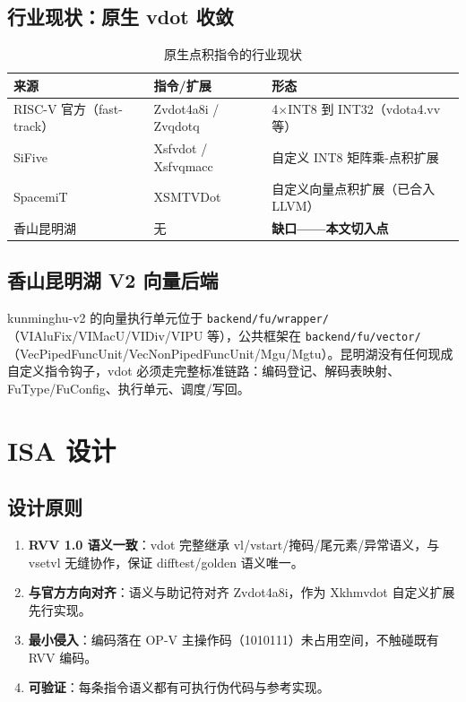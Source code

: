 \documentclass[11pt]{article}
\begin{document}
\subsection{行业现状：原生 vdot 收敛}
\begin{table}[htbp]
\centering
\caption{原生点积指令的行业现状}
\label{tab:industry}
\begin{tabular}{l l l}
\toprule
\textbf{来源} & \textbf{指令/扩展} & \textbf{形态} \\
\midrule
RISC-V 官方（fast-track） & Zvdot4a8i / Zvqdotq & 4$\times$INT8 到 INT32（vdota4.vv 等） \\
SiFive & Xsfvdot / Xsfvqmacc & 自定义 INT8 矩阵乘-点积扩展 \\
SpacemiT & XSMTVDot & 自定义向量点积扩展（已合入 LLVM） \\
香山昆明湖 & 无 & \textbf{缺口——本文切入点} \\
\bottomrule
\end{tabular}
\end{table}

\subsection{香山昆明湖 V2 向量后端}
kunminghu-v2 的向量执行单元位于 \texttt{backend/fu/wrapper/}（VIAluFix/VIMacU/VIDiv/VIPU 等），公共框架在 \texttt{backend/fu/vector/}（VecPipedFuncUnit/VecNonPipedFuncUnit/Mgu/Mgtu）。昆明湖没有任何现成自定义指令钩子，vdot 必须走完整标准链路：编码登记、解码表映射、FuType/FuConfig、执行单元、调度/写回。

\section{ISA 设计}
\subsection{设计原则}
\begin{enumerate}
  \item \textbf{RVV 1.0 语义一致}：vdot 完整继承 vl/vstart/掩码/尾元素/异常语义，与 vsetvl 无缝协作，保证 difftest/golden 语义唯一。
  \item \textbf{与官方方向对齐}：语义与助记符对齐 Zvdot4a8i，作为 Xkhmvdot 自定义扩展先行实现。
  \item \textbf{最小侵入}：编码落在 OP-V 主操作码（1010111）未占用空间，不触碰既有 RVV 编码。
  \item \textbf{可验证}：每条指令语义都有可执行伪代码与参考实现。
\end{enumerate}
\end{document}
